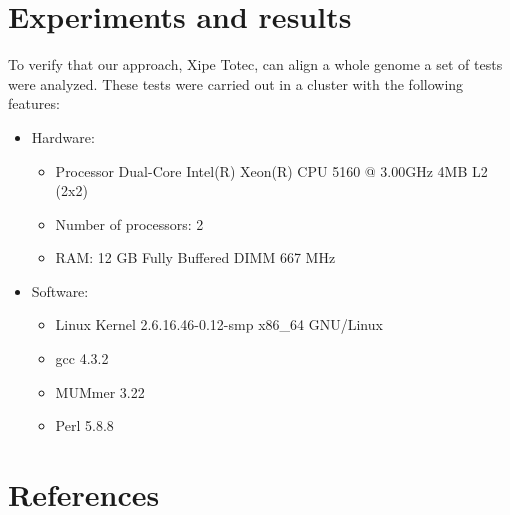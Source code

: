 \documentclass[3p,times]{elsarticle}
\begin{document}
\section{Experiments and results}
To verify that our approach, Xipe Totec, can align a whole genome a set of tests were analyzed. These tests were carried out in a cluster with the following features:
\begin{itemize}
\item Hardware: 
\begin{itemize}
\item Processor Dual-Core Intel(R) Xeon(R) CPU 5160 @ 3.00GHz 4MB L2 (2x2)
\item Number of processors: 2
\item RAM: 12 GB Fully Buffered DIMM 667 MHz
\end{itemize}
\item  Software:
\begin{itemize}
\item Linux Kernel 2.6.16.46-0.12-smp x86\_64 GNU/Linux
\item gcc 4.3.2
\item MUMmer 3.22
\item Perl 5.8.8
\end{itemize}
\end{itemize}



\section*{References}








\end{document}
